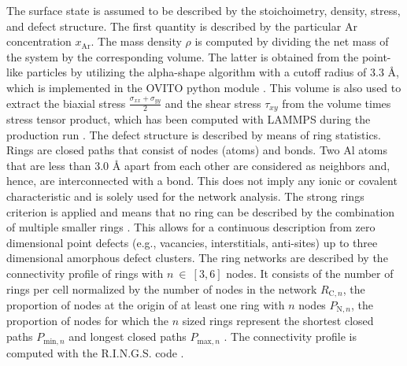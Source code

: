 \documentclass[12pt,a4paper,preprint,superscriptaddress]{revtex4-1}
\begin{document}
The surface state is assumed to be described by the stoichoimetry, density, stress, and defect structure. The first quantity is described by the particular Ar concentration $x_\mathrm{Ar}$. The mass density $\rho$ is computed by dividing the net mass of the system by the corresponding volume. The latter is obtained from the point-like particles by utilizing the alpha-shape algorithm with a cutoff radius of 3.3 \r A, which is implemented in the OVITO python module \citep{stukowski2009visualization,stukowski2014computational}. This volume is also used to extract the biaxial stress $\frac{\sigma_{xx}+\sigma_{yy}}{2}$ and the shear stress $\tau_{xy}$ from the volume times stress tensor product, which has been computed with LAMMPS during the production run \citep{plimpton1995fast,thompson2022lammps,thompson2009general}. The defect structure is described by means of ring statistics. Rings are closed paths that consist of nodes (atoms) and bonds. Two Al atoms that are less than 3.0 \r A apart from each other are considered as neighbors and, hence, are interconnected with a bond. This does not imply any ionic or covalent characteristic and is solely used for the network analysis. The strong rings criterion is applied and means that no ring can be described by the combination of multiple smaller rings \citep{yuan2002efficient,goetzke1991properties}. This allows for a continuous description from zero dimensional point defects (e.g., vacancies, interstitials, anti-sites) up to three dimensional amorphous defect clusters. The ring networks are described by the connectivity profile of rings with $n~\in~[3,6]$ nodes. It consists of the number of rings per cell normalized by the number of nodes in the network $R_{\mathrm{C},n}$, the proportion of nodes at the origin of at least one ring with $n$ nodes $P_{\mathrm{N},n}$, the proportion of nodes for which the $n$ sized rings represent the shortest closed paths $P_{\mathrm{min},n}$ and longest closed paths $P_{\mathrm{max},n}$ \citep{drabold2005models,cobb1996ab,zhang2000structural}. The connectivity profile is computed with the R.I.N.G.S. code \citep{le2010ring}.
\end{document}
